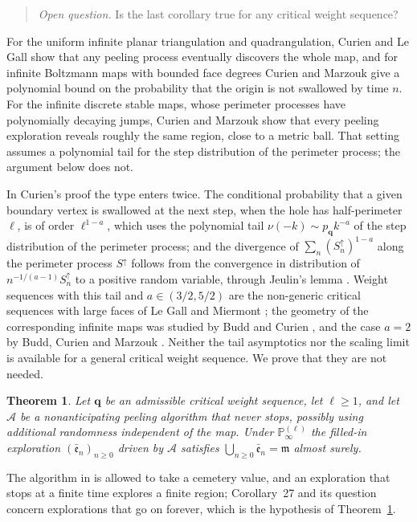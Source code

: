 \documentclass[11pt]{amsart}
\newtheorem{theorem}{Theorem}[section]
\theoremstyle{remark}
\numberwithin{equation}{section}
\newcommand{\1}{\mathbf 1}
\begin{document}
\begin{quote}
\emph{Open question.} Is the last corollary true for any critical weight sequence?
\end{quote}

For the uniform infinite planar triangulation and quadrangulation, Curien and Le Gall \cite[Corollary~6]{CLG} show that any peeling process eventually discovers the whole map, and for infinite Boltzmann maps with bounded face degrees Curien and Marzouk \cite{CM} give a polynomial bound on the probability that the origin is not swallowed by time $n$. For the infinite discrete stable maps, whose perimeter processes have polynomially decaying jumps, Curien and Marzouk \cite{CMr} show that every peeling exploration reveals roughly the same region, close to a metric ball. That setting assumes a polynomial tail for the step distribution of the perimeter process; the argument below does not.

In Curien's proof the type enters twice. The conditional probability that a given boundary vertex is swallowed at the next step, when the hole has half-perimeter $\ell$, is of order $\ell^{1-a}$, which uses the polynomial tail $\nu(-k)\sim p_{\mathbf q}k^{-a}$ of the step distribution of the perimeter process; and the divergence of $\sum_n(S^\uparrow_n)^{1-a}$ along the perimeter process $S^\uparrow$ follows from the convergence in distribution of $n^{-1/(a-1)}S^\uparrow_n$ to a positive random variable, through Jeulin's lemma \cite[Proposition~4(c)]{Jeu}. Weight sequences with this tail and $a\in(3/2,5/2)$ are the non-generic critical sequences with large faces of Le Gall and Miermont \cite{LGM}; the geometry of the corresponding infinite maps was studied by Budd and Curien \cite{BC}, and the case $a=2$ by Budd, Curien and Marzouk \cite{BCM}. Neither the tail asymptotics nor the scaling limit is available for a general critical weight sequence. We prove that they are not needed.

\begin{theorem}\label{thm:main}
Let $\mathbf q$ be an admissible critical weight sequence, let $\ell\ge1$, and let $\mathcal A$ be a nonanticipating peeling algorithm that never stops, possibly using additional randomness independent of the map. Under $\mathbb P^{(\ell)}_\infty$ the filled-in exploration $(\bar{\mathfrak e}_n)_{n\ge0}$ driven by $\mathcal A$ satisfies $\bigcup_{n\ge0}\bar{\mathfrak e}_n=\mathfrak m$ almost surely.
\end{theorem}

The algorithm in \cite{Cur} is allowed to take a cemetery value, and an exploration that stops at a finite time explores a finite region; Corollary~27 and its question concern explorations that go on forever, which is the hypothesis of Theorem~\ref{thm:main}.
\end{document}
